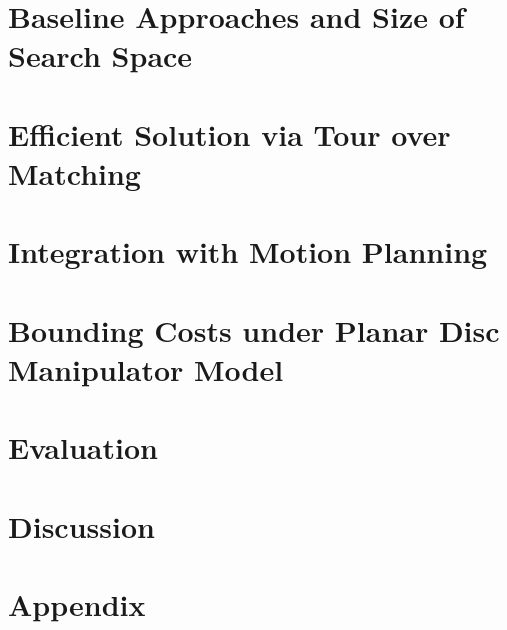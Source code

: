 \documentclass[journal]{IEEEtran}
\begin{document}
\section{Baseline Approaches and Size of Search Space}
\label{sec:baseline}
\vspace{-.1in}


\section{Efficient Solution via Tour over Matching}
\label{sec:approximation}


\section{Integration with Motion Planning}
\label{sec:integration}


\section{Bounding Costs under Planar Disc Manipulator Model}
\label{sec:cost_bounds}


\section{Evaluation}
\label{sec:evaluation}


\section{Discussion}
\label{sec:discussion}


%
% 

 


\section{Appendix}
\label{sec:appendix}

\end{document}
